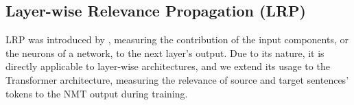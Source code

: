 \documentclass[11pt]{article}
\newcommand{\isidora}[1]{{\color{red}{\small\bf\sf [Isidora: #1]}}}
\begin{document}
\subsection*{Layer-wise Relevance Propagation (LRP)}
LRP %
was introduced by \citet{bach2015pixel}, measuring the contribution of the input components, or the neurons of a network, to the next layer's output. Due to its nature, it is directly applicable to layer-wise architectures, and we extend its usage to the Transformer architecture, measuring the relevance of source and target sentences' tokens to the NMT output during training.


\begin{comment}
\subsection*{Neural Machine Translation analysis}
\citet{voita2020analyzing} examine the source and target sentences' tokens' relative contributions to text generation during NMT, adapting the Layerwise Relevance Propagation (LRP) score to a Transformer model, and experimenting with different training objectives, training data amounts and types of target sentence prefixes, and their effect on NMT output quality and monotonicity. Following up to that work,
\citet{voita2021language} conduct a thorough analysis into the different stages of NMT, drawing parallels to the distinct stages identified in standard SMT. Their findings include decomposing NMT into three phases, targetside language modeling, word-by-word translation, and sentence reordering, and using the key learning advantages of each stage for selecting the best teacher models to improve non-autoregressive NMT.  We attempt to examine and identify whether those stages exist in UNMT. 
\end{comment}

\end{document}
